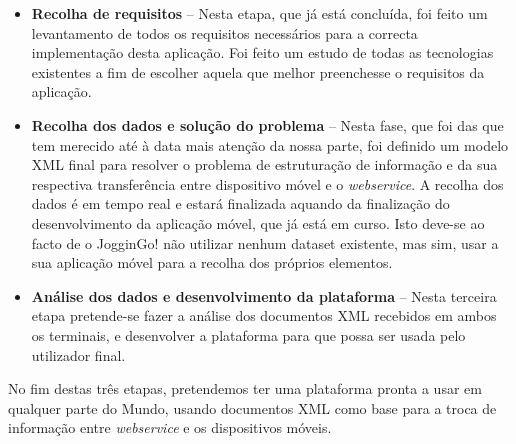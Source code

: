 \documentclass[twocolumn,twoside,10pt,a4paper]{article}
\begin{document}
\begin{itemize}
\item \textbf{Recolha de requisitos} -- Nesta etapa, que já está concluída, foi feito um levantamento de todos os requisitos necessários para a correcta implementação desta aplicação. Foi feito um estudo de todas as tecnologias existentes a fim de escolher aquela que melhor preenchesse o requisitos da aplicação.
\item \textbf{Recolha dos dados e solução do problema} -- Nesta fase, que foi das que tem merecido até à data mais atenção da nossa parte, foi definido um modelo XML final para resolver o problema de estruturação de informação e da sua respectiva transferência entre dispositivo móvel e o \textit{webservice}. A recolha dos dados é em tempo real e estará finalizada aquando da finalização do desenvolvimento da aplicação móvel, que já está em curso. Isto deve-se ao facto de o JogginGo! não utilizar nenhum dataset existente, mas sim, usar a sua aplicação móvel para a recolha dos próprios elementos.
\item \textbf{Análise dos dados e desenvolvimento da plataforma}  -- Nesta terceira etapa pretende-se fazer a análise dos documentos XML recebidos em ambos os terminais, e desenvolver a plataforma para que possa ser usada pelo utilizador final.
\end{itemize}

No fim destas três etapas, pretendemos ter uma plataforma pronta a usar em qualquer parte do Mundo, usando documentos XML como base para a troca de informação entre 	\textit{webservice} e os dispositivos móveis.


\nocite{*}
\renewcommand{\bibname}{Referências}
%
%

%
{}
\end{document}
